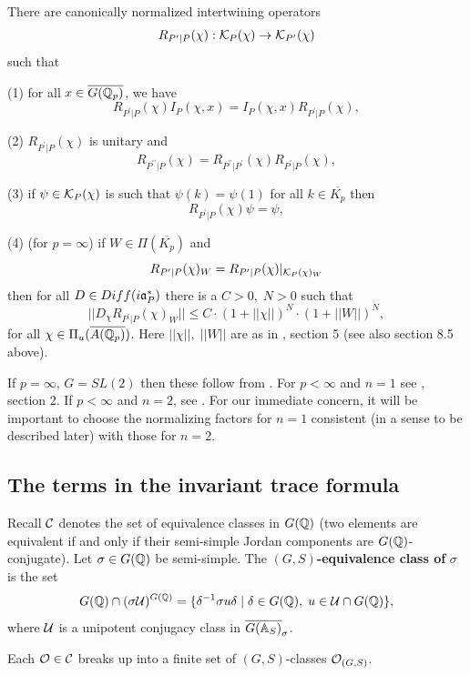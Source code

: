 \begin{conjecture}
There are canonically normalized intertwining operators 
\[
R_{P^{\prime }|P}(\chi ):{\cal{K}}_P(\chi )\rightarrow
{\cal{K}}_{P^{\prime}}(\chi ) 
\]
such that

(1) for all $x\in \overline{G({\Bbb{Q}}_p)}$, we have 
\[
R_{P^{\prime }|P}(\chi )I_P(\chi ,x)
=I_P(\chi ,x)R_{P^{\prime }|P}(\chi ), 
\]

(2) $R_{P^{\prime }|P}(\chi )$ is unitary and 
\[
R_{P^{\prime \prime }|P}(\chi )
=R_{P^{\prime \prime }|P^{\prime }}(\chi)R_{P^{\prime }|P}(\chi ), 
\]

(3) if $\psi \in {\cal K}_P(\chi )$ is such that
$\psi (k)=\psi (1)$
for all $k\in \overline{K_p}$ then 
\[
R_{P^{\prime }|P}(\chi )\psi =\psi , 
\]

(4) (for $p=\infty $) if $W\in \Pi (\overline{K_p})$ and 
\[
R_{P^{\prime }|P}(\chi )_W=R_{P^{\prime }|P}(\chi )|_{{\cal{K}}_P(\chi )_W}
\]
then for all $D\in Diff(i{\frak {a}}_P^{*})$ there is a $C>0,\;N>0$ such
that 
\[
||D_\chi R_{P^{\prime }|P}(\chi )_W||\leq C\cdot (1+||\chi ||)^N\cdot
(1+||W||)^N,
\]
for all $\chi \in \Pi _u(\overline{A({\Bbb{Q}}_p)})$.
Here $||\chi||,\;||W||$ are as in \cite{A6}, section 5
(see also section 8.5 above).
\end{conjecture}

If $p=\infty $, $G=SL(2)$ then these follow from \cite{Sa}.
For $p<\infty$ and $n=1$ see \cite{A16}, section 2. If $p<\infty$
and $n=2$, see \cite{GS}. For our immediate concern, it will be
important to choose the normalizing factors for $n=1$
consistent (in a sense to be described later)
with those for $n=2$.

\subsection{The terms in the invariant trace formula}

Recall ${\cal C}$ denotes the set of equivalence classes in $G({\Bbb {Q}})$
(two elements are equivalent if and only if their semi-simple
Jordan components are $G({\Bbb{Q}})$-conjugate). Let
$\sigma \in G({\Bbb{Q}})$ be semi-simple. The
$(G,S)${\bf -equivalence class of }$\sigma $ is
the set 
\[
G({\Bbb{Q}})\cap (\sigma {\cal{U}})^{G({\Bbb{Q}})}
=\{\delta ^{-1}\sigma u\delta
\;|\;\delta \in G({\Bbb{Q}}),\;u\in {\cal{U}}\cap G({\Bbb{Q}})\}, 
\]
where ${\cal{U}}$ is a unipotent conjugacy class in
$\overline{G({\Bbb {A}}_S)}_\sigma$.

\begin{lemma}
Each ${\cal{O}}\in {\cal{C}}$ breaks up into a finite set of
$(G,S)$-classes ${\cal{O}}_{(G,S)}$.
\end{lemma}

